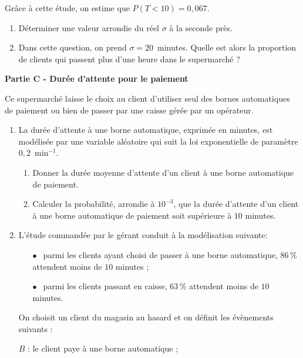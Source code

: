 \documentclass{cornouaille}
\begin{document}
\begin{exercice}
Grâce à cette étude, on estime que $P(T < 10) = 0,067$.

\medskip

\begin{enumerate}
\item Déterminer une valeur arrondie du réel $\sigma$ à la seconde près.
\item Dans cette question, on prend $\sigma = 20$~minutes. Quelle est alors la proportion de clients qui
passent plus d'une heure dans le supermarché ?
\end{enumerate}

\bigskip

\textbf{Partie C - Durée d'attente pour le paiement}

\medskip

Ce supermarché laisse le choix au client d'utiliser seul des bornes automatiques de paiement ou
bien de passer par une caisse gérée par un opérateur.

\medskip

\begin{enumerate}
\item La durée d'attente à une borne automatique, exprimée en minutes, est modélisée par une
variable aléatoire qui suit la loi exponentielle de paramètre $0,2$~min$^{-1}$.
	\begin{enumerate}
		\item Donner la durée moyenne d'attente d'un client à une borne automatique de paiement.
		\item Calculer la probabilité, arrondie à $10^{-3}$, que la durée d'attente d'un client à une borne automatique de paiement soit supérieure à $10$ minutes.
	\end{enumerate}
\item L'étude commandée par le gérant conduit à la modélisation suivante:
	
\setlength\parindent{9mm}
\begin{itemize}
\item[$\bullet~~$] parmi les clients ayant choisi de passer à une borne automatique, 86\,\% attendent moins de $10$ minutes ;
\item[$\bullet~~$] parmi les clients passant en caisse, 63\,\% attendent moins de $10$ minutes.
\end{itemize}
\setlength\parindent{0mm}

\medskip

On choisit un client du magasin au hasard et on définit les évènements suivants :

$B$ : \og le client paye à une borne automatique \fg{} ;


\end{enumerate}
\end{exercice}
\end{document}

